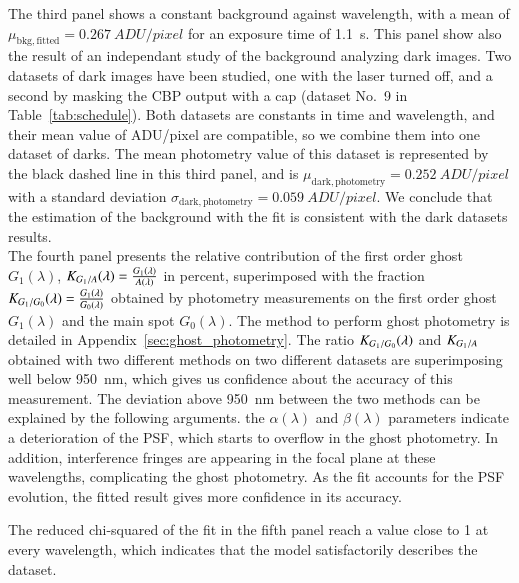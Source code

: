 The third panel shows a constant background against wavelength, with a mean of $\mu_\mathrm{bkg, fitted}=\SI{0.267}{ADU/pixel}$ for an exposure time of \SI{1.1}{\second}. This panel show also the result of an independant study of the background analyzing dark images. Two datasets of dark images have been studied, one with the laser turned off, and a second by masking the CBP output with a cap (dataset No.~9 in Table~\ref{tab:schedule}). Both datasets are constants in time and wavelength, and their mean value of ADU/pixel are compatible, so we combine them into one dataset of darks. The mean photometry value of this dataset is represented by the black dashed line in this third panel, and is $\mu_\mathrm{dark, photometry}=\SI{0.252}{ADU/pixel}$ with a standard deviation $\sigma_\mathrm{dark, photometry}=\SI{0.059}{ADU/pixel}$. We conclude that the estimation of the background with the fit is consistent with the dark datasets results. \\

The fourth panel presents the relative contribution of the first order ghost $G_1(\lambda)$, $K_{G_1/A}(\lambda) = \frac{G_1(\lambda)}{A(\lambda)}$ in percent, superimposed with the fraction $K_{G_1/G_0}(\lambda)=\frac{G_1(\lambda)}{G_0(\lambda)}$ obtained by photometry measurements on the first order ghost $G_1(\lambda)$ and the main spot $G_0(\lambda)$. The method to perform ghost photometry is detailed in Appendix~\ref{sec:ghost_photometry}. The ratio $K_{G_1/G_0}(\lambda)$ and $K_{G_1/A}$ obtained with two different methods on two different datasets are superimposing well below \SI{950}{\nano\meter}, which gives us confidence about the accuracy of this measurement. The deviation above \SI{950}{\nano\meter} between the two methods can be explained by the following arguments. the $\alpha(\lambda)$ and $\beta(\lambda)$ parameters indicate a deterioration of the PSF, which starts to overflow in the ghost photometry. In addition, interference fringes are appearing in the focal plane at these wavelengths, complicating the ghost photometry. As the fit accounts for the PSF evolution, the fitted result gives more confidence in its accuracy.

The reduced chi-squared of the fit in the fifth panel reach a value close to 1 at every wavelength, which indicates that the model satisfactorily describes the dataset.

